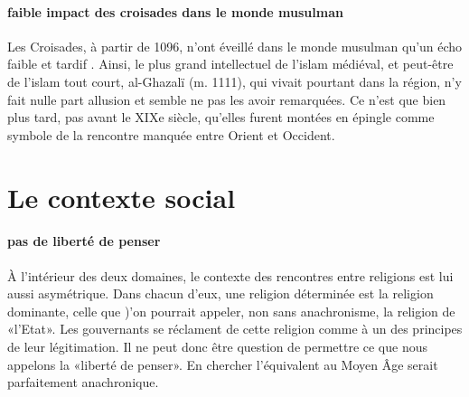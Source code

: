 \paragraph{faible impact des croisades dans le monde musulman}
Les Croisades, à partir de 1096, n'ont éveillé dans le monde musulman qu'un écho faible et tardif . Ainsi, le plus grand intellectuel de l'islam médiéval, et peut-être de l'islam tout court, al-Ghazalï (m. 1111), qui vivait pourtant dans la région, n'y fait nulle part allusion et semble ne pas les avoir remarquées. Ce n'est que bien plus tard, pas avant le XIXe siècle, qu'elles furent montées en épingle comme symbole de la rencontre manquée entre Orient et Occident.

\section{Le contexte social}

\paragraph{pas de liberté de penser}
À l'intérieur des deux domaines, le contexte des rencontres entre religions est lui aussi asymétrique. Dans chacun d'eux, une religion déterminée est la religion dominante, celle que )'on pourrait appeler, non sans anachronisme, la religion de «l'Etat». Les
gouvernants se réclament de cette religion comme à un des principes de leur légitimation. Il ne peut donc être question de permettre ce que nous appelons la «liberté de penser». En chercher l'équivalent au Moyen Âge serait parfaitement anachronique.

